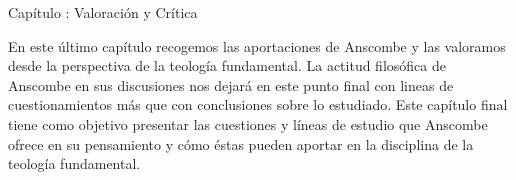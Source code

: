\documentclass[11pt]{article}
\begin{document}
{\begin{spacing}{1.5}
{\LARGE Capítulo : 
Valoración y Crítica}

\begin{spacing}{1}
En este último capítulo recogemos las aportaciones de Anscombe y las valoramos desde la perspectiva de la teología fundamental. La actitud filosófica de Anscombe en sus discusiones nos dejará en este punto final con lineas de cuestionamientos más que con conclusiones sobre lo estudiado. Este capítulo final tiene como objetivo presentar las cuestiones y líneas de estudio que Anscombe ofrece en su pensamiento y cómo éstas pueden aportar en la disciplina de la teología fundamental.
\end{spacing}

\end{spacing}
}
\end{document}
